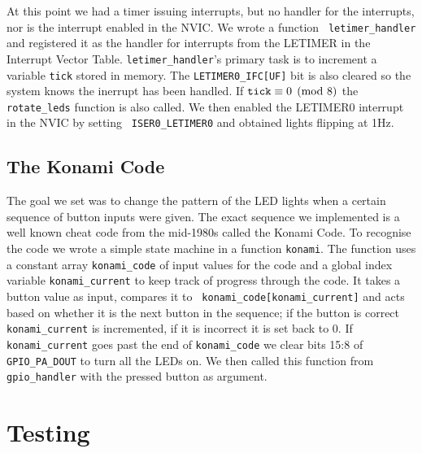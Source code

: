 At this point we had a timer issuing interrupts, but no handler for the
interrupts, nor is the interrupt enabled in the NVIC. We wrote a function {\tt
letimer\_handler} and registered it as the handler for interrupts from the
LETIMER in the Interrupt Vector Table. {\tt letimer\_handler}'s primary task is
to increment a variable {\tt tick} stored in memory. The {\tt LETIMER0\_IFC[UF]}
bit is also cleared so the system knows the inerrupt has been handled. If \(
{\tt tick} \equiv 0 \pmod 8 \) the {\tt rotate\_leds} function is also called.
We then enabled the LETIMER0 interrupt in the NVIC by setting {\tt
ISER0\_LETIMER0} and obtained lights flipping at 1Hz.

\subsection{The Konami Code}

The goal we set was to change the pattern of the LED lights when a certain
sequence of button inputs were given. The exact sequence we implemented is a
well known cheat code from the mid-1980s called the Konami Code. To recognise
the code we wrote a simple state machine in a function {\tt konami}. The
function uses a constant array {\tt konami\_code} of input values for the code
and a global index variable {\tt konami\_current} to keep track of progress
through the code. It takes a button value as input, compares it to {\tt
konami\_code[konami\_current]} and acts based on whether it is the next button
in the sequence; if the button is correct {\tt konami\_current} is incremented,
if it is incorrect it is set back to 0. If {\tt konami\_current} goes past the
end of {\tt konami\_code} we clear bits 15:8 of {\tt GPIO\_PA\_DOUT} to turn all
the LEDs on. We then called this function from {\tt gpio\_handler} with the
pressed button as argument.

\section{Testing}
